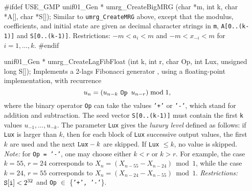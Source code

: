 #ifdef USE_GMP
   unif01_Gen * umrg_CreateBigMRG (char *m, int k, char *A[], char *S[]);
\endcode
 \tab Similar to {\tt umrg\_CreateMRG} above, except that the modulus,
   coefficients, and initial state are given as decimal character strings
   in {\tt m}, {\tt A[0..(k-1)]} and {\tt S[0..(k-1)]}.
   Restrictions:  $-m < a_i < m$ and $-m < x_{-i} < m$ for $i = 1,\dots,k$.
 \endtab
\code
#endif


unif01_Gen * umrg_CreateLagFibFloat (int k, int r, char Op, int Lux,
                                     unsigned long S[]);
\endcode
  \tab Implements a 2-lags Fibonacci generator \cite{rMAR85a,rKNU98a},
  using a floating-point implementation,
%
  with recurrence
 $$
    u_n = (u_{n-k} \mbox{ \tt Op } u_{n-r}) \bmod 1,
 $$
  where the binary operator {\tt Op} can take the values
  {\tt '+'} or {\tt '-'}, which stand for addition and subtraction.
  The seed vector {\tt S[0..(k-1)]} must contain the first {\tt k} values
  $u_{-1},\dots,u_{-k}$.
  The parameter {\tt Lux} gives the {\em luxury level} defined as
  follows: if {\tt Lux} is larger than $k$,
  then for each block of {\tt Lux} successive output values,
  the first $k$ are used and the next ${\tt Lux} - k$ are skipped.
  If {\tt Lux} $\le k$, no value is skipped. {\em Note:} for {\tt Op = '-'},
   one may choose either $k < r$ or $k > r$.  For example, the case
   $k=55$, $r=24$ corresponds to $X_n = (X_{n-55} -  X_{n-24}) \bmod 1$,
   while the case $k=24$, $r=55$ corresponds to $X_n = (X_{n-24} -  X_{n-55})
   \bmod 1$.
  {\em Restrictions:} ${\tt S[i]} < 2^{32}$ and  {\tt Op} $\in$ \{{\tt '+', '-'}\}.
  \endtab
\code


